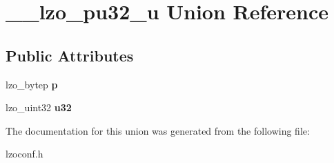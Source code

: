 \hypertarget{union____lzo__pu32__u}{\section{\-\_\-\-\_\-lzo\-\_\-pu32\-\_\-u \-Union \-Reference}
\label{union____lzo__pu32__u}
}
\subsection*{\-Public \-Attributes}
\begin{DoxyCompactItemize}
\item 
\hypertarget{union____lzo__pu32__u_aadb67ec0a943cd43491495133c5d530a}{lzo\-\_\-bytep {\bfseries p}}\label{union____lzo__pu32__u_aadb67ec0a943cd43491495133c5d530a}

\item 
\hypertarget{union____lzo__pu32__u_a82fcddfd2dd2f829eff5d03eeb80be0d}{lzo\-\_\-uint32 {\bfseries u32}}\label{union____lzo__pu32__u_a82fcddfd2dd2f829eff5d03eeb80be0d}

\end{DoxyCompactItemize}


\-The documentation for this union was generated from the following file\-:\begin{DoxyCompactItemize}
\item 
lzoconf.\-h\end{DoxyCompactItemize}
